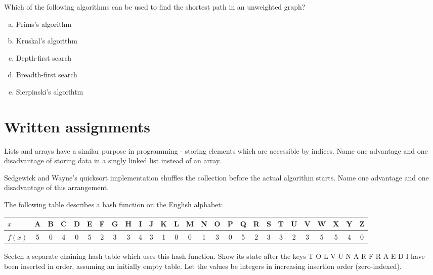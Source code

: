 \documentclass[addpoints]{exam}
\begin{document}
\begin{questions}
	\question[3]

	Which of the following algorithms can be used to find the shortest path in an unweighted graph?

	\begin{enumerate}[a)]
		\item Prims's algorithm
		\item Kruskal's algorithm
		\item Depth-first search
		\item Breadth-first search
		\item Sierpinski's algorihtm
	\end{enumerate}

	\section{Written assignments}

	\question[5]

	Lists and arrays have a similar purpose in programming - storing elements which are accessible by indices. Name one advantage and one disadvantage of storing data in a singly linked list instead of an array.


	\question[5]
	Sedgewick and Wayne's quicksort implementation shuffles the collection before the actual algorithm starts. Name one advantage and one disadvantage of this arrangement.


	\newpage

	\question[5]

	The following table describes a hash function on the English alphabet:

	\begin{center}
		\scriptsize
		\begin{tabular}{l*{26}{c}}
			\toprule
			$x$    & A & B & C & D & E & F & G & H & I & J & K & L & M & N & O & P & Q & R & S & T & U & V & W & X & Y & Z \\
			\midrule
			$f(x)$ & 5 & 0 & 4 & 0 & 5 & 2 & 3 & 3 & 4 & 3 & 1 & 0 & 0 & 1 & 3 & 0 & 5 & 2 & 3 & 3 & 2 & 3 & 5 & 5 & 4 & 0 \\
			\bottomrule
		\end{tabular}
	\end{center}

	Scetch a separate chaining hash table which uses this hash function. Show its state after the keys T O L V U N A R F R A E D I have been inserted in order, assuming an initially empty table. Let the values be integers in increasing insertion order (zero-indexed).


\end{questions}
\end{document}
